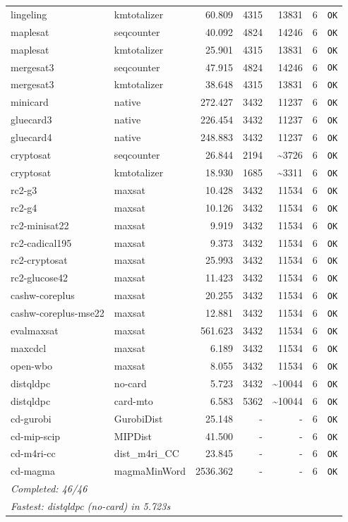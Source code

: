 \begin{longtable}{llrrrl p{}}
lingeling & kmtotalizer & 60.809 & 4315 & 13831 & 6 & \texttt{OK} \\
maplesat & seqcounter & 40.092 & 4824 & 14246 & 6 & \texttt{OK} \\
maplesat & kmtotalizer & 25.901 & 4315 & 13831 & 6 & \texttt{OK} \\
mergesat3 & seqcounter & 47.915 & 4824 & 14246 & 6 & \texttt{OK} \\
mergesat3 & kmtotalizer & 38.648 & 4315 & 13831 & 6 & \texttt{OK} \\
minicard & native & 272.427 & 3432 & 11237 & 6 & \texttt{OK} \\
gluecard3 & native & 226.454 & 3432 & 11237 & 6 & \texttt{OK} \\
gluecard4 & native & 248.883 & 3432 & 11237 & 6 & \texttt{OK} \\
cryptosat & seqcounter & 26.844 & 2194 & \textasciitilde{}3726 & 6 & \texttt{OK} \\
cryptosat & kmtotalizer & 18.930 & 1685 & \textasciitilde{}3311 & 6 & \texttt{OK} \\
rc2-g3 & maxsat & 10.428 & 3432 & 11534 & 6 & \texttt{OK} \\
rc2-g4 & maxsat & 10.126 & 3432 & 11534 & 6 & \texttt{OK} \\
rc2-minisat22 & maxsat & 9.919 & 3432 & 11534 & 6 & \texttt{OK} \\
rc2-cadical195 & maxsat & 9.373 & 3432 & 11534 & 6 & \texttt{OK} \\
rc2-cryptosat & maxsat & 25.993 & 3432 & 11534 & 6 & \texttt{OK} \\
rc2-glucose42 & maxsat & 11.423 & 3432 & 11534 & 6 & \texttt{OK} \\
cashw-coreplus & maxsat & 20.255 & 3432 & 11534 & 6 & \texttt{OK} \\
cashw-coreplus-mse22 & maxsat & 12.881 & 3432 & 11534 & 6 & \texttt{OK} \\
evalmaxsat & maxsat & 561.623 & 3432 & 11534 & 6 & \texttt{OK} \\
maxcdcl & maxsat & 6.189 & 3432 & 11534 & 6 & \texttt{OK} \\
open-wbo & maxsat & 8.055 & 3432 & 11534 & 6 & \texttt{OK} \\
distqldpc & no-card & 5.723 & 3432 & \textasciitilde{}10044 & 6 & \texttt{OK} \\
distqldpc & card-mto & 6.583 & 5362 & \textasciitilde{}10044 & 6 & \texttt{OK} \\
cd-gurobi & GurobiDist & 25.148 & - & - & 6 & \texttt{OK} \\
cd-mip-scip & MIPDist & 41.500 & - & - & 6 & \texttt{OK} \\
cd-m4ri-cc & dist\_m4ri\_CC & 23.845 & - & - & 6 & \texttt{OK} \\
cd-magma & magmaMinWord & 2536.362 & - & - & 6 & \texttt{OK} \\
\midrule
\multicolumn{7}{l}{\textit{Completed: 46/46}} \\
\multicolumn{7}{l}{\textit{Fastest: distqldpc (no-card) in 5.723s}} \\
\end{longtable}
